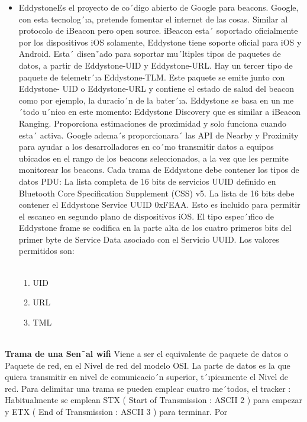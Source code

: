 \documentclass[conference,compsoc,onecolumn]{IEEEtran}
\begin{document}
\begin{itemize}
\item EddystoneEs el proyecto de co´digo abierto de Google para beacons. Google, con esta tecnolog´ıa, pretende fomentar el internet de las cosas. Similar al protocolo de iBeacon pero open source. iBeacon esta´ soportado oficialmente por los dispositivos iOS solamente, Eddystone tiene soporte oficial para iOS y Android. Esta´  disen˜ado  para  soportar  mu´ltiples  tipos  de  paquetes  de  datos,  a  partir  de  Eddystone-UID  y  Eddystone-URL. Hay un tercer tipo de paquete de telemetr´ıa Eddystone-TLM. Este paquete se emite junto con Eddystone- UID  o  Eddystone-URL  y  contiene  el  estado  de  salud  del  beacon  como  por  ejemplo,  la  duracio´n  de  la bater´ıa.  Eddystone  se  basa  en  un  me´todo  u´nico  en  este  momento:  Eddystone  Discovery  que  es  similar  a iBeacon Ranging. Proporciona estimaciones de proximidad y solo funciona cuando esta´ activa. Google adema´s proporcionara´  las API  de  Nearby y  Proximity  para ayudar  a los  desarrolladores  en co´mo  transmitir datos  a equipos ubicados en el rango de los beacons seleccionados, a la vez que les permite monitorear los beacons. Cada trama de Eddystone debe contener los tipos de datos PDU: La lista completa de 16 bits de servicios UUID definido en Bluetooth Core Specification Supplement (CSS) v5. La lista de 16 bits debe contener el Eddystone Service UUID 0xFEAA. Esto es incluido para permitir el escaneo en segundo plano de dispositivos iOS. El tipo espec´ıfico de Eddystone frame se codifica en la parte alta de los cuatro primeros bits del primer byte de Service Data asociado con el Servicio UUID. Los valores permitidos son:
\\ \\
\begin{enumerate}
    \item UID 
    \item URL
    \item TML \\ \\
\end{enumerate}

\end{itemize}

\textbf{Trama de una Sen˜al wifi }Viene a ser el equivalente de paquete de datos o Paquete de red, en el Nivel de red del modelo OSI. La parte de datos es la que quiera transmitir en nivel de comunicacio´n superior, t´ıpicamente el Nivel de  red.  Para  delimitar  una  trama  se  pueden  emplear  cuatro  me´todos,  el  tracker  :  Habitualmente  se  emplean  STX ( Start of Transmission : ASCII 2 ) para empezar y ETX ( End of Transmission : ASCII 3 ) para terminar. Por
 
\end{document}
